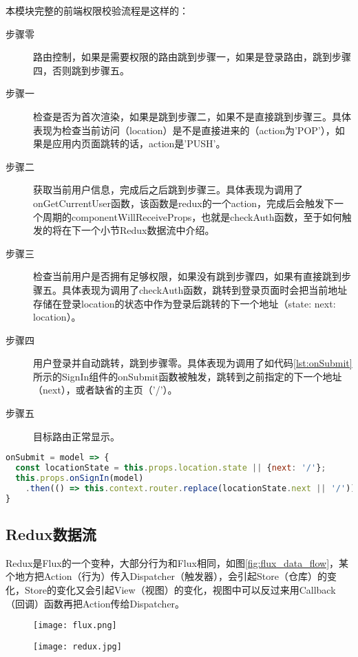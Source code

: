 本模块完整的前端权限校验流程是这样的：
\begin{description}
  \item[步骤零] 路由控制，如果是需要权限的路由跳到步骤一，如果是登录路由，跳到步骤四，否则跳到步骤五。
  \item[步骤一] 检查是否为首次渲染，如果是跳到步骤二，如果不是直接跳到步骤三。具体表现为检查当前访问（location）是不是直接进来的（action为'POP'），如果是应用内页面跳转的话，action是'PUSH'。
  \item[步骤二] 获取当前用户信息，完成后之后跳到步骤三。具体表现为调用了onGetCurrentUser函数，该函数是redux的一个action，完成后会触发下一个周期的componentWillReceiveProps，也就是checkAuth函数，至于如何触发的将在下一个小节Redux数据流中介绍。
  \item[步骤三] 检查当前用户是否拥有足够权限，如果没有跳到步骤四，如果有直接跳到步骤五。具体表现为调用了checkAuth函数，跳转到登录页面时会把当前地址存储在登录location的状态中作为登录后跳转的下一个地址（state: {next: location}）。
  \item[步骤四] 用户登录并自动跳转，跳到步骤零。具体表现为调用了如代码\ref{lst:onSubmit}所示的SignIn组件的onSubmit函数被触发，跳转到之前指定的下一个地址（next），或者缺省的主页（'/'）。
  \item[步骤五] 目标路由正常显示。
\end{description}
\begin{lstlisting}[language={JavaScript}, label={lst:onSubmit}, caption={SignIn组件中的onSubmit函数}]
onSubmit = model => {
  const locationState = this.props.location.state || {next: '/'};
  this.props.onSignIn(model)
    .then(() => this.context.router.replace(locationState.next || '/'))
}
\end{lstlisting}
\subsection{Redux数据流}
Redux是Flux的一个变种，大部分行为和Flux相同，如图\ref{fig:flux_data_flow}，某个地方把Action（行为）传入Dispatcher（触发器），会引起Store（仓库）的变化，Store的变化又会引起View（视图）的变化，视图中可以反过来用Callback（回调）函数再把Action传给Dispatcher。
\begin{figure}[!htp]
 \centering
 \texttt{[image: flux.png]}
\end{figure}

\begin{figure}[!htp]
 \centering
 \texttt{[image: redux.jpg]}
\end{figure}

